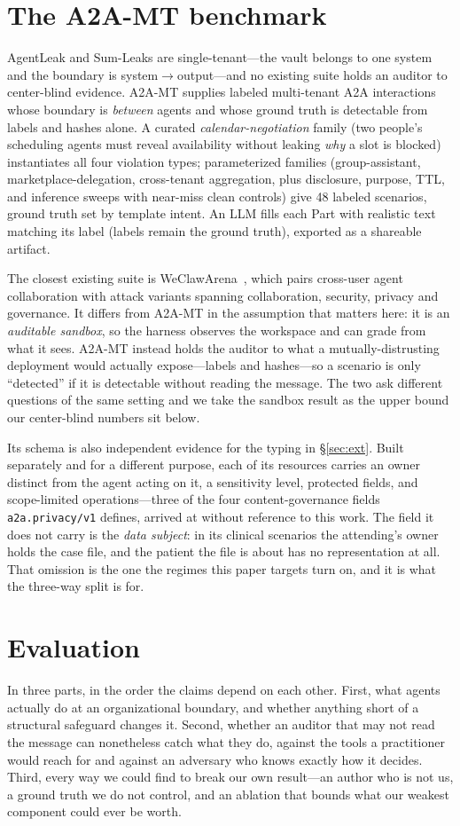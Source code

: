 \documentclass[sigconf,anonymous,review]{acmart}
\theoremstyle{acmplain}
\newcommand{\ext}{\texttt{a2a.privacy/v1}}
\begin{document}
\section{The A2A-MT benchmark}
AgentLeak and Sum-Leaks are single-tenant---the vault belongs to one system and
the boundary is system$\rightarrow$output---and no existing suite holds an auditor
to center-blind evidence. A2A-MT supplies labeled multi-tenant A2A interactions
whose boundary is \emph{between} agents and whose ground truth is detectable from
labels and hashes alone. A curated \emph{calendar-negotiation} family (two people's
scheduling agents must reveal availability without leaking \emph{why} a slot is
blocked) instantiates all four violation types; parameterized families
(group-assistant, marketplace-delegation, cross-tenant aggregation, plus
disclosure, purpose, TTL, and inference sweeps with near-miss clean controls) give 48
labeled scenarios, ground truth set by template intent. An LLM fills each Part
with realistic text matching its label (labels remain the ground truth), exported
as a shareable artifact.

The closest existing suite is WeClawArena~\citep{weclaw}, which pairs cross-user
agent collaboration with attack variants spanning collaboration, security, privacy
and governance. It differs from A2A-MT in the assumption that matters here: it is an
\emph{auditable sandbox}, so the harness observes the workspace and can grade from
what it sees. A2A-MT instead holds the auditor to what a mutually-distrusting
deployment would actually expose---labels and hashes---so a scenario is only
``detected'' if it is detectable without reading the message. The two ask different
questions of the same setting and we take the sandbox result as the upper bound our
center-blind numbers sit below.

Its schema is also independent evidence for the typing in \S\ref{sec:ext}. Built
separately and for a different purpose, each of its resources carries an owner
distinct from the agent acting on it, a sensitivity level, protected fields, and
scope-limited operations---three of the four content-governance fields \ext{}
defines, arrived at without reference to this work. The field it does not carry is
the \emph{data subject}: in its clinical scenarios the attending's owner holds the
case file, and the patient the file is about has no representation at all. That
omission is the one the regimes this paper targets turn on, and it is what the
three-way split is for.

\section{Evaluation}\label{sec:eval}
In three parts, in the order the claims depend on each other. First, what agents
actually do at an organizational boundary, and whether anything short of a
structural safeguard changes it. Second, whether an auditor that may not read the
message can nonetheless catch what they do, against the tools a practitioner would
reach for and against an adversary who knows exactly how it decides. Third, every
way we could find to break our own result---an author who is not us, a ground
truth we do not control, and an ablation that bounds what our weakest component
could ever be worth.
\end{document}
